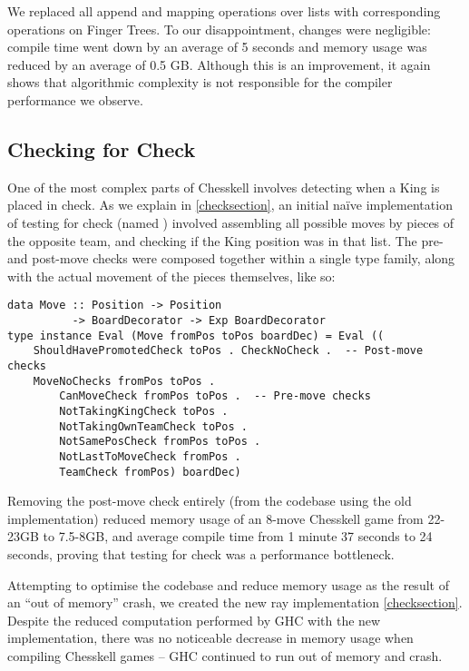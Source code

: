 We replaced all append and mapping operations over lists with corresponding operations on Finger Trees. To our disappointment, changes were negligible: compile time went down by an average of 5 seconds and memory usage was reduced by an average of 0.5 GB. Although this is an improvement, it again shows that algorithmic complexity is not responsible for the compiler performance we observe.

\subsection{Checking for Check}

One of the most complex parts of Chesskell involves detecting when a King is placed in check. As we explain in \cref{checksection}, an initial na\"ive implementation of testing for check (named ) involved assembling all possible moves by pieces of the opposite team, and checking if the King position was in that list. The pre- and post-move checks were composed together within a single type family, along with the actual movement of the pieces themselves, like so:
\begin{lstlisting}
data Move :: Position -> Position
          -> BoardDecorator -> Exp BoardDecorator
type instance Eval (Move fromPos toPos boardDec) = Eval ((
    ShouldHavePromotedCheck toPos . CheckNoCheck .  -- Post-move checks
    MoveNoChecks fromPos toPos .
        CanMoveCheck fromPos toPos .  -- Pre-move checks
        NotTakingKingCheck toPos .
        NotTakingOwnTeamCheck toPos .
        NotSamePosCheck fromPos toPos .
        NotLastToMoveCheck fromPos .
        TeamCheck fromPos) boardDec)
\end{lstlisting}
Removing the  post-move check entirely (from the codebase using the old implementation) reduced memory usage of an 8-move Chesskell game from 22-23GB to 7.5-8GB, and average compile time from 1 minute 37 seconds to 24 seconds, proving that testing for check was a performance bottleneck.

Attempting to optimise the codebase and reduce memory usage as the result of an ``out of memory'' crash, we created the new ray implementation \cref{checksection}. Despite the reduced computation performed by GHC with the new implementation, there was no noticeable decrease in memory usage when compiling Chesskell games -- GHC continued to run out of memory and crash.

